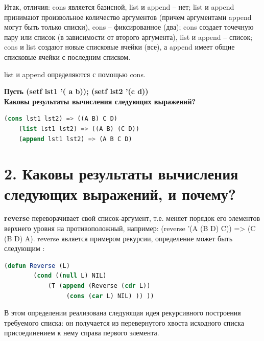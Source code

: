\documentclass[12pt]{report}
\begin{document}
Итак, отличия: cons является базисной, list и append -- нет; list и append принимают произвольное количество аргументов (причем аргументами append могут быть только списки), cons -- фиксированное (два); cons создает точечную пару или список (в зависимости от второго аргумента), list и append -- список; cons и list создают новые списковые ячейки (все), а append имеет общие списковые ячейки с последним списком.

list и append определяются с помощью cons.

\clearpage
\textbf{Пусть (setf lst1 '( a b)); (setf lst2 '(c d))\\
	Каковы результаты вычисления следующих выражений?}


\begin{lstlisting}[language=Lisp]	
	(cons lst1 lst2) => ((A B) C D)
	(list lst1 lst2) => ((A B) (C D))
	(append lst1 lst2) => (A B C D)
\end{lstlisting}


\section*{2. Каковы результаты вычисления следующих выражений, и почему?
}

\textbf{reverse} переворачивает свой список-аргумент, т.е. меняет порядок его элементов  верхнего уровня на противоположный, например:  (reverse '(A (B D) C)) => (C (B D) A). reverse является примером рекурсии, определение может быть следующим \cite{bolshakova}:

\begin{lstlisting}[language=Lisp]	
	(defun Reverse (L) 
		(cond ((null L) NIL)
			(T (append (Reverse (cdr L)) 
				 (cons (car L) NIL) )) ))
\end{lstlisting}

В этом определении реализована следующая идея рекурсивного построения требуемого списка: он получается из перевернутого хвоста исходного списка присоединением к нему справа первого элемента. 

\end{document}
